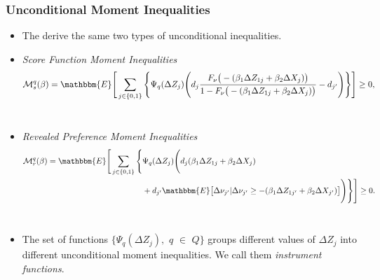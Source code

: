 \documentclass[10pt,letterpaper]{beamer}
\begin{document}

\begin{frame}
\frametitle{Unconditional Moment Inequalities}

\begin{itemize}
\item The derive the same two types of unconditional inequalities. 

\item \textit{Score Function Moment Inequalities}  {\small \ 
\begin{align*}
\mathcal{M}^{q}_{s}(\beta)=\mathbbm{E}\Bigg[\sum_{j\in\{0,1\}}\Bigg\{%
\Psi_{q}(\Delta Z_{j})\Bigg(d_{j}\frac{F_{\nu}\big(-(\beta_{1}\Delta
Z_{1j}+\beta_{2}\Delta X_{j})\big)}{1-F_{\nu}\big(-(\beta_{1}\Delta
Z_{1j}+\beta_{2}\Delta X_{j})\big)}-d_{j^{\prime }}\Bigg)\Bigg\}\Bigg]\geq 0,
\end{align*}
}{\normalsize \ }

\item {\normalsize \textit{Revealed Preference Moment Inequalities}  }%
{\small \ 
\begin{align*}
\mathcal{M}^{q}_{r}(\beta)=\mathbbm{E}\Bigg[\sum_{j\in\{0,1\}}\Bigg\{%
&\Psi_{q}(\Delta Z_{j})\Bigg(d_{j}(\beta_{1}\Delta Z_{1j}+\beta_{2}\Delta
X_{j})  \notag \\
&+d_{j^{\prime }}\mathbbm{E}\big[\Delta\nu_{j^{\prime
}}|\Delta\nu_{j^{\prime }}\geq-(\beta_{1}\Delta Z_{1j^{\prime
}}+\beta_{2}\Delta X_{j^{\prime }})\big]\Bigg)\Bigg\}\Bigg]\geq 0.
\end{align*}
}{\normalsize \ }

\item {\normalsize The set of functions $\{\Psi_{q}(\Delta Z_{j}),$ $q$ $\in$
$Q\}$ groups different values of $\Delta Z_{j}$ into different unconditional
moment inequalities. We call them \textit{instrument functions}. }
\end{itemize}
\end{frame}

\end{document}
